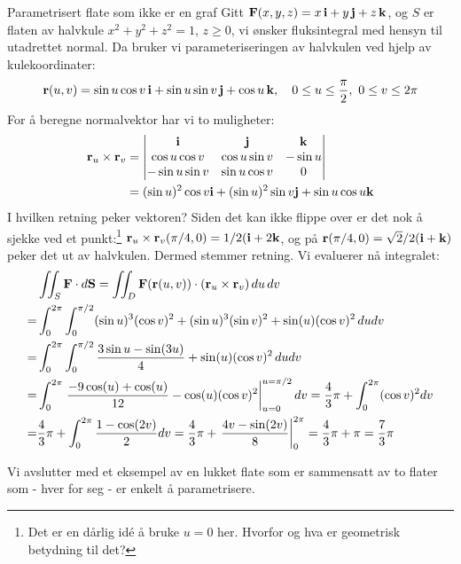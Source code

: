 \begin{eks}{Parametrisert flate som ikke er en graf}\label{ex:halvkule}
Gitt \( \mathbf{F}(x, y, z) = x\, \mathbf{i} + y\, \mathbf{j} + z\, \mathbf{k} \), og \( S \) er flaten av halvkule \( x^2 + y^2 + z^2 = 1 \), \( z \geq 0 \), vi ønsker fluksintegral med hensyn til utadrettet normal.
Da bruker vi parameteriseringen av halvkulen ved hjelp av kulekoordinater:
\[
\mathbf{r}(u, v) = \sin u \cos v\, \mathbf{i} + \sin u \sin v\, \mathbf{j} + \cos u\, \mathbf{k}, \quad 0 \leq u \leq \frac{\pi}{2},\ 0 \leq v \leq 2\pi
\]
For å beregne normalvektor har vi to muligheter: 
\begin{align*}
\mathbf{r}_u \times \mathbf{r}_v &= \begin{vmatrix}
   \mathbf{i} & \mathbf{j} & \mathbf{k} \\
   \cos u \cos v & \cos u \sin v & - \sin u \\
   -\sin u \sin v & \sin u \cos v & 0 
\end{vmatrix} \\&= (\sin u)^2\cos v \mathbf{i}+(\sin u)^2\sin v \mathbf{j}+\sin u  \cos u \mathbf{k}
\end{align*}
I hvilken retning peker vektoren? Siden det  kan ikke flippe over er det nok å sjekke ved et punkt:\footnote{Det er en dårlig id\'{e} å bruke $u=0$ her. Hvorfor og hva er geometrisk betydning til det?} $\mathbf{r}_u \times \mathbf{r}_v (\pi/4,0)= 1/2(\mathbf{i}+2\mathbf{k}$, og på $\mathbf{r}(\pi/4,0)=\sqrt{2}/2(\mathbf{i}+\mathbf{k})$ peker det ut av halvkulen. Dermed stemmer retning. Vi evaluerer nå integralet:
\begin{align*}
&\iint_S \mathbf{F} \cdot d\mathbf{S} = \iint_D \mathbf{F}(\mathbf{r}(u,v)) \cdot (\mathbf{r}_u \times \mathbf{r}_v)\, du\, dv\\
=& \int_0^{2\pi}\int_0^{\pi/2} (\sin u)^3(\cos v)^2 + (\sin u)^3(\sin v)^2 + \sin (u)(\cos v)^2 \, du dv \\ =& \int_0^{2\pi}\int_0^{\pi/2} \frac{3\sin u - \sin (3u)}{4} + \sin (u)(\cos v)^2 \, du dv \\ =& \int_0^{2\pi}\left. \frac{-9\cos (u) +\cos (u)}{12}-\cos (u)(\cos v)^2\right|_{u=0}^{u=\pi/2} dv = \frac{4}{3}\pi + \int_0^{2\pi}
 (\cos v)^2 dv\\
 =& \frac{4}{3}\pi + \int_0^{2\pi} \frac{1-\cos (2v)}{2} dv =  \frac{4}{3}\pi+ \left. \frac{4v-\sin (2v)}{8}\right|_{0}^{2\pi} = \frac{4}{3}\pi+\pi = \frac{7}{3}\pi \end{align*}
\end{eks}
%
Vi avslutter med et eksempel av en lukket flate som er sammensatt av to flater som - hver for seg - er enkelt å parametrisere.
